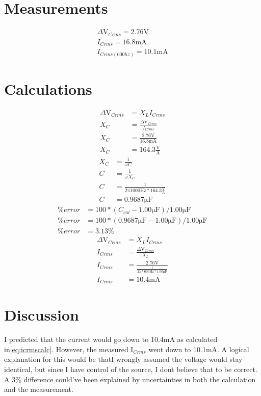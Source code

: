 \documentclass{report}
\begin{document}
\section{Measurements}

\begin{gather}
    \Delta\si{\volt}_{Crms}=2.76\si{\volt}\\
    I_{Crms}=16.8\si{\milli\ampere}\\
    I_{Crms(600hz)}=10.1\si{\milli\ampere}
\end{gather}

\section{ Calculations}

\begin{align}
    \Delta\si{\volt}_{Crms}&=X_{L}I_{Crms}\nonumber\\
    X_{C}&=\frac{\Delta\si{\volt}_{Crms}}{I_{Crms}}\nonumber\\
    X_{C}&=\frac{2.76\si{\volt}}{16.8\si{\milli\ampere}}\nonumber\\
    X_{C}&=164.3\frac{\si{\volt}}{\si{\ampere}}\label{eq:xccalc}
\end{align}
\begin{align}
    X_{C}&=\frac{1}{\omega C}\nonumber\\
    C&=\frac{1}{\omega X_{C}}\nonumber\\
    C&=\frac{1}{2\pi1000\si{\hertz}*164.3\frac{\si{\volt}}{\si{\ampere}}}\nonumber\\
    C&=0.9687\si{\micro\farad}
\end{align}
\begin{align}
    \%error&=100 * (C_{cal} - 1.00\si{\micro\farad})/1.00\si{\micro\farad}\nonumber\\
    \%error&=100 * (0.9687\si{\micro\farad} - 1.00\si{\micro\farad})/1.00\si{\micro\farad}\nonumber\\
    \%error&=3.13\%
\end{align}
\begin{align}
    \Delta\si{\volt}_{Crms}&=X_{L}I_{Crms}\nonumber\\
    I_{Crms}&=\frac{\Delta\si{\volt}_{Crms}}{X_{L}}\nonumber\\
    I_{Crms}&=\frac{2.76\si{\volt}}{\frac{1}{2\pi*600\si{\hertz}*1.00\si{\micro\farad}}}\nonumber\\
    I_{Crms}&=10.4\si{\milli\ampere}\label{eq:icrmscalc}
\end{align}

\section{Discussion}

I predicted that the current would go down to 10.4\si{\milli\ampere} as calculated in\eqref{eq:icrmscalc}. However, the measured I$_{Crms}$ went down to 10.1mA. A logical explanation for this would be thatI wrongly assumed the voltage would stay identical, but since I have control of the source, I dont believe that to be correct. A 3\% difference could've been explained by uncertainties in both the calculation and the measurement.
\end{document}
